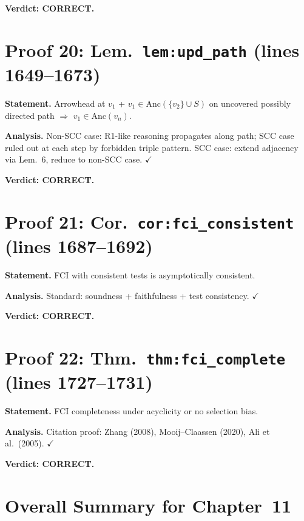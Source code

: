 \documentclass{article}
\begin{document}
\textbf{Verdict: CORRECT.}

\section{Proof 20: Lem.\ \texttt{lem:upd\_path} (lines 1649--1673)}
\textbf{Statement.} Arrowhead at $v_1$ + $v_1\in\mathrm{Anc}(\{v_2\}\cup S)$
on uncovered possibly directed path $\Rightarrow$ $v_1\in\mathrm{Anc}(v_n)$.

\textbf{Analysis.} Non-SCC case: R1-like reasoning propagates along path;
SCC case ruled out at each step by forbidden triple pattern.
SCC case: extend adjacency via Lem.~6, reduce to non-SCC case.  $\checkmark$

\textbf{Verdict: CORRECT.}

\section{Proof 21: Cor.\ \texttt{cor:fci\_consistent} (lines 1687--1692)}
\textbf{Statement.} FCI with consistent tests is asymptotically consistent.

\textbf{Analysis.} Standard: soundness + faithfulness + test consistency.
$\checkmark$

\textbf{Verdict: CORRECT.}

\section{Proof 22: Thm.\ \texttt{thm:fci\_complete} (lines 1727--1731)}
\textbf{Statement.} FCI completeness under acyclicity or no selection bias.

\textbf{Analysis.} Citation proof: Zhang (2008), Mooij--Claassen (2020),
Ali et al.\ (2005).  $\checkmark$

\textbf{Verdict: CORRECT.}

\section*{Overall Summary for Chapter~11}
\end{document}
